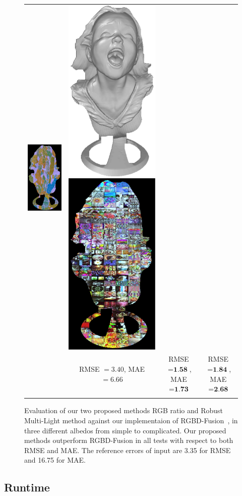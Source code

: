 \begin{figure}
{\begin{tabular}{cccc}
\includegraphics[height=0.25\linewidth]{figures/result/comp_robust_pattern_albedo.pdf} &
\includegraphics[height=0.25\linewidth]{figures/result/comp_robust_love_shape.pdf} 
\includegraphics[height=0.25\linewidth]{figures/result/comp_robust_love_albedo.pdf} \\
& {\small RMSE $= 3.40$, MAE $=6.66$} & {\small RMSE $= \textbf{1.58}$, MAE $=\textbf{1.73}$} & {\small RMSE $= \textbf{1.84}$, MAE $=\textbf{2.68}$} \\
 \\
  \end{tabular}
  }
  \caption{Evaluation of our two proposed methods RGB ratio and Robust Multi-Light method against our implementaion of RGBD-Fusion~\cite{or2015rgbd}, in three different albedos from simple to complicated. Our proposed methods outperform RGBD-Fusion in all tests with respect to both RMSE and MAE. The reference errors of input are 3.35 for RMSE and 16.75 for MAE.}
  \label{fig:result_syn_comp}
\end{figure}


\subsection{Runtime}

